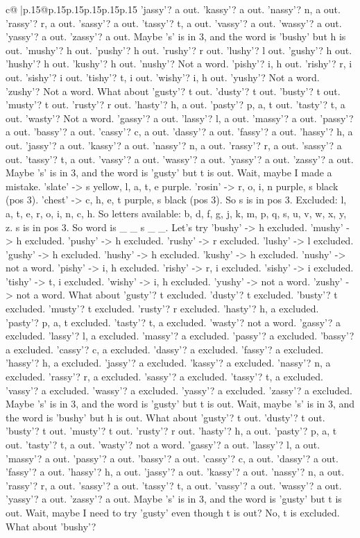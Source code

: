 \documentclass{article}
\begin{document}
{\begin{supertabular}{c@{$\;$}|p{.15\linewidth}@{}p{.15\linewidth}p{.15\linewidth}p{.15\linewidth}p{.15\linewidth}p{.15\linewidth}}
{{{'jassy'? a out. 'kassy'? a out. 'nassy'? n, a out. 'rassy'? r, a out. 'sassy'? a out. 'tassy'? t, a out. 'vassy'? a out. 'wassy'? a out. 'yassy'? a out. 'zassy'? a out. Maybe 's' is in 3, and the word is 'bushy' but h is out. 'mushy'? h out. 'pushy'? h out. 'rushy'? r out. 'lushy'? l out. 'gushy'? h out. 'hushy'? h out. 'kushy'? h out. 'nushy'? Not a word. 'pishy'? i, h out. 'rishy'? r, i out. 'sishy'? i out. 'tishy'? t, i out. 'wishy'? i, h out. 'yushy'? Not a word. 'zushy'? Not a word. What about 'gusty'? t out. 'dusty'? t out. 'busty'? t out. 'musty'? t out. 'rusty'? r out. 'hasty'? h, a out. 'pasty'? p, a, t out. 'tasty'? t, a out. 'wasty'? Not a word. 'gassy'? a out. 'lassy'? l, a out. 'massy'? a out. 'passy'? a out. 'bassy'? a out. 'cassy'? c, a out. 'dassy'? a out. 'fassy'? a out. 'hassy'? h, a out. 'jassy'? a out. 'kassy'? a out. 'nassy'? n, a out. 'rassy'? r, a out. 'sassy'? a out. 'tassy'? t, a out. 'vassy'? a out. 'wassy'? a out. 'yassy'? a out. 'zassy'? a out. Maybe 's' is in 3, and the word is 'gusty' but t is out. Wait, maybe I made a mistake. 'slate' {-}> s yellow, l, a, t, e purple. 'rosin' {-}> r, o, i, n purple, s black (pos 3). 'chest' {-}> c, h, e, t purple, s black (pos 3). So s is in pos 3. Excluded: l, a, t, e, r, o, i, n, c, h. So letters available: b, d, f, g, j, k, m, p, q, s, u, v, w, x, y, z. s is in pos 3. So word is \_ \_ s \_ \_. Let's try 'bushy' {-}> h excluded. 'mushy' {-}> h excluded. 'pushy' {-}> h excluded. 'rushy' {-}> r excluded. 'lushy' {-}> l excluded. 'gushy' {-}> h excluded. 'hushy' {-}> h excluded. 'kushy' {-}> h excluded. 'nushy' {-}> not a word. 'pishy' {-}> i, h excluded. 'rishy' {-}> r, i excluded. 'sishy' {-}> i excluded. 'tishy' {-}> t, i excluded. 'wishy' {-}> i, h excluded. 'yushy' {-}> not a word. 'zushy' {-}> not a word. What about 'gusty'? t excluded. 'dusty'? t excluded. 'busty'? t excluded. 'musty'? t excluded. 'rusty'? r excluded. 'hasty'? h, a excluded. 'pasty'? p, a, t excluded. 'tasty'? t, a excluded. 'wasty'? not a word. 'gassy'? a excluded. 'lassy'? l, a excluded. 'massy'? a excluded. 'passy'? a excluded. 'bassy'? a excluded. 'cassy'? c, a excluded. 'dassy'? a excluded. 'fassy'? a excluded. 'hassy'? h, a excluded. 'jassy'? a excluded. 'kassy'? a excluded. 'nassy'? n, a excluded. 'rassy'? r, a excluded. 'sassy'? a excluded. 'tassy'? t, a excluded. 'vassy'? a excluded. 'wassy'? a excluded. 'yassy'? a excluded. 'zassy'? a excluded. Maybe 's' is in 3, and the word is 'gusty' but t is out. Wait, maybe 's' is in 3, and the word is 'bushy' but h is out. What about 'gusty'? t out. 'dusty'? t out. 'busty'? t out. 'musty'? t out. 'rusty'? r out. 'hasty'? h, a out. 'pasty'? p, a, t out. 'tasty'? t, a out. 'wasty'? not a word. 'gassy'? a out. 'lassy'? l, a out. 'massy'? a out. 'passy'? a out. 'bassy'? a out. 'cassy'? c, a out. 'dassy'? a out. 'fassy'? a out. 'hassy'? h, a out. 'jassy'? a out. 'kassy'? a out. 'nassy'? n, a out. 'rassy'? r, a out. 'sassy'? a out. 'tassy'? t, a out. 'vassy'? a out. 'wassy'? a out. 'yassy'? a out. 'zassy'? a out. Maybe 's' is in 3, and the word is 'gusty' but t is out. Wait, maybe I need to try 'gusty' even though t is out? No, t is excluded. What about 'bushy'? }}}
\end{supertabular}}
\end{document}
